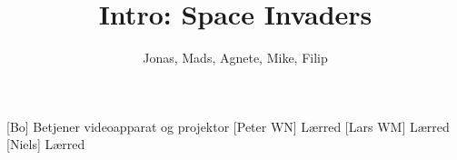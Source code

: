 \documentclass[danish]{article}
\title{Intro: Space Invaders}
\author{Jonas, Mads, Agnete, Mike, Filip}
\begin{document}
\maketitle

\begin{roles}
  [Bo] Betjener videoapparat og projektor
  [Peter WN] Lærred
  [Lars WM] Lærred
  [Niels] Lærred
\end{roles}

\begin{sketch}

\end{sketch}
\end{document}
